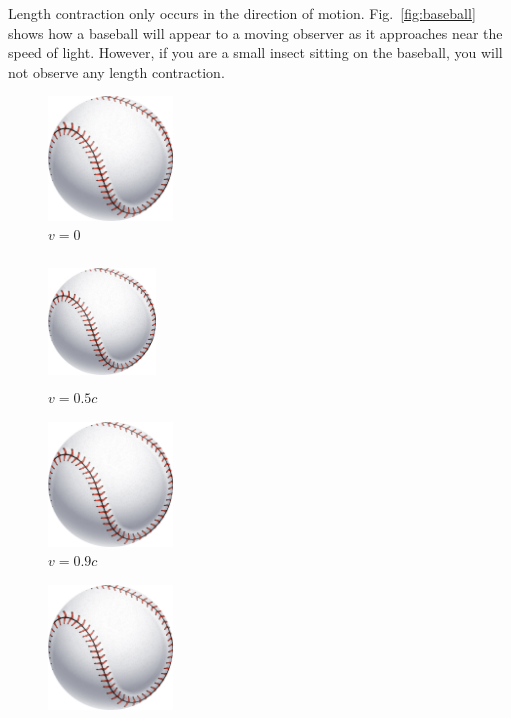 Length contraction only occurs in the direction of motion.
Fig.~\ref{fig:baseball} shows how a baseball will appear to a moving observer
as it approaches near the speed of light. However, if you are a small insect
sitting on the baseball, you will not observe any length contraction.

\begin{figure}[ht]
  \centering
  \begin{minipage}{1.5in}
    \centering
    \includegraphics[width=1.3in]{specialRelativity/baseball}\\
    $v=0$
  \end{minipage}
  \hspace{\stretch1}
  \begin{minipage}{1in}
    \centering
    \includegraphics[height=1.3in,width=1.12in]{specialRelativity/baseball}\\
    $v=0.5c$
  \end{minipage}
  \hspace{\stretch1}
  \begin{minipage}{1in}
    \centering
    \includegraphics[height=1.3in,width=.567in]{specialRelativity/baseball}\\
    $v=0.9c$
  \end{minipage}
  \begin{minipage}{1in}
    \centering
    \includegraphics[height=1.3in,width=.183in]{specialRelativity/baseball}\\

\end{minipage}
\end{figure}
